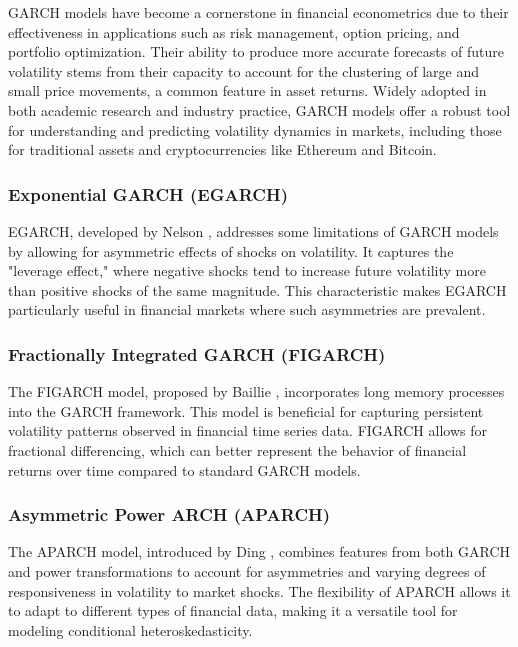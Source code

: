 \documentclass[8pt]{article}
\begin{document}
\begin{multicols}{2}
\smallskip
GARCH models have become a cornerstone in financial econometrics due to their effectiveness in applications such as risk management, option pricing, and portfolio optimization. Their ability to produce more accurate forecasts of future volatility stems from their capacity to account for the clustering of large and small price movements, a common feature in asset returns. Widely adopted in both academic research and industry practice, GARCH models offer a robust tool for understanding and predicting volatility dynamics in markets, including those for traditional assets and cryptocurrencies like Ethereum and Bitcoin.
		
		\subsubsection{Exponential GARCH (EGARCH)}
		EGARCH, developed by Nelson \cite{nelson1991}, addresses some limitations of GARCH models by allowing for asymmetric effects of shocks on volatility. It captures the "leverage effect," where negative shocks tend to increase future volatility more than positive shocks of the same magnitude. This characteristic makes EGARCH particularly useful in financial markets where such asymmetries are prevalent.
		
		\subsubsection{Fractionally Integrated GARCH (FIGARCH)}
		The FIGARCH model, proposed by Baillie \cite{baillie1996}, incorporates long memory processes into the GARCH framework. This model is beneficial for capturing persistent volatility patterns observed in financial time series data. FIGARCH allows for fractional differencing, which can better represent the behavior of financial returns over time compared to standard GARCH models.
		
		\subsubsection{Asymmetric Power ARCH (APARCH)}
		The APARCH model, introduced by Ding \cite{ding1993}, combines features from both GARCH and power transformations to account for asymmetries and varying degrees of responsiveness in volatility to market shocks. The flexibility of APARCH allows it to adapt to different types of financial data, making it a versatile tool for modeling conditional heteroskedasticity.
		

\end{multicols}
\end{document}
